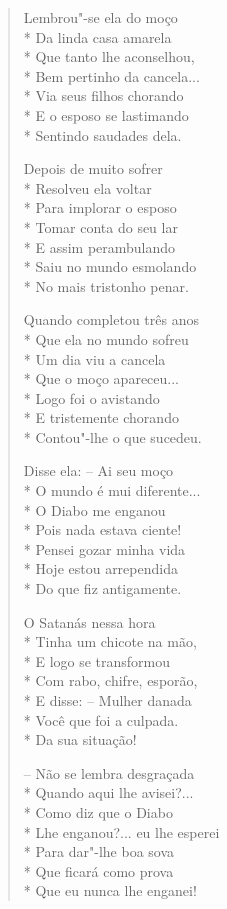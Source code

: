 \begin{verse}
Lembrou"-se ela do moço\\*
Da linda casa amarela\\*
Que tanto lhe aconselhou,\\*
Bem pertinho da cancela...\\*
Via seus filhos chorando\\*
E o esposo se lastimando\\*
Sentindo saudades dela.

Depois de muito sofrer\\*
Resolveu ela voltar\\*
Para implorar o esposo\\*
Tomar conta do seu lar\\*
E assim perambulando\\*
Saiu no mundo esmolando\\*
No mais tristonho penar.

Quando completou três anos\\*
Que ela no mundo sofreu\\*
Um dia viu a cancela\\*
Que o moço apareceu...\\*
Logo foi o avistando\\*
E tristemente chorando\\*
Contou"-lhe o que sucedeu.

Disse ela: --  Ai seu moço\\*
O mundo é mui diferente...\\*
O Diabo me enganou\\*
Pois nada estava ciente!\\*
Pensei gozar minha vida\\*
Hoje estou arrependida\\*
Do que fiz antigamente.

O Satanás nessa hora\\*
Tinha um chicote na mão,\\*
E logo se transformou\\*
Com rabo, chifre, esporão,\\*
E disse: --  Mulher danada\\*
Você que foi a culpada.\\*
Da sua situação!

--  Não se lembra desgraçada\\*
Quando aqui lhe avisei?...\\*
Como diz que o Diabo\\*
Lhe enganou?... eu lhe esperei\\*
Para dar"-lhe boa sova\\*
Que ficará como prova\\*
Que eu nunca lhe enganei!


\end{verse}
